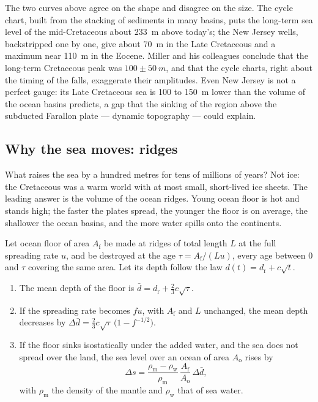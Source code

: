 The two curves above agree on the shape and disagree on the size. The cycle chart, built from
the stacking of sediments in many basins, puts the long-term sea level of the mid-Cretaceous
about \qty{233}{m} above today's; the New Jersey wells, backstripped one by one, give about
\qty{70}{m} in the Late Cretaceous and a maximum near \qty{110}{m} in the Eocene. Miller and his
colleagues conclude that the long-term Cretaceous peak was $100 \pm \qty{50}{m}$, and that the
cycle charts, right about the timing of the falls, exaggerate their amplitudes. Even New Jersey
is not a perfect gauge: its Late Cretaceous sea is 100 to \qty{150}{m} lower than the volume of
the ocean basins predicts, a gap that the sinking of the region above the subducted Farallon
plate --- dynamic topography --- could explain.

\subsection*{Why the sea moves: ridges}

What raises the sea by a hundred metres for tens of millions of years? Not ice: the Cretaceous
was a warm world with at most small, short-lived ice sheets. The leading answer is the volume of
the ocean ridges. Young ocean floor is hot and stands high; the faster the plates spread, the
younger the floor is on average, the shallower the ocean basins, and the more water spills onto
the continents.

\begin{proposition}\label{prop:b2:phanerozoic-earth:ridge}
Let ocean floor of area $A_{\text{f}}$ be made at ridges of total length $L$ at the full
spreading rate $u$, and be destroyed at the age $\tau = A_{\text{f}}/(Lu)$, every age between 0
and $\tau$ covering the same area. Let its depth follow the law $d(t) = d_{\text{r}} + c\sqrt t$.
\begin{enumerate}
  \item The mean depth of the floor is $\bar d = d_{\text{r}} + \tfrac23 c\sqrt\tau$.
  \item If the spreading rate becomes $fu$, with $A_{\text{f}}$ and $L$ unchanged, the mean
        depth decreases by $\Delta\bar d = \tfrac23 c\sqrt\tau\,\bigl(1 - f^{-1/2}\bigr)$.
  \item If the floor sinks isostatically under the added water, and the sea does not spread
        over the land, the sea level over an ocean of area $A_{\text{o}}$ rises by
        \[
        \Delta s = \frac{\rho_{\text{m}} - \rho_{\text{w}}}{\rho_{\text{m}}}\,
        \frac{A_{\text{f}}}{A_{\text{o}}}\,\Delta\bar d ,
        \]
        with $\rho_{\text{m}}$ the density of the mantle and $\rho_{\text{w}}$ that of sea water.
\end{enumerate}
\end{proposition}

